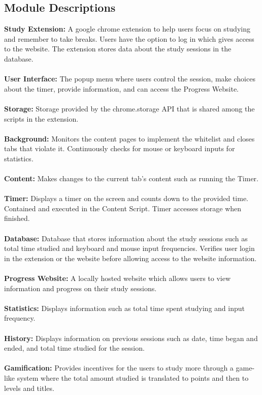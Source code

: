 \documentclass[12pt]{article}
\begin{document}
\subsection{Module Descriptions}
\textbf{Study Extension:} A google chrome extension to help users focus on studying and remember to take breaks. Users have the option to log in which gives access to the website. The extension stores data about the study sessions in the database. \\\\
\textbf{User Interface:} The popup menu where users control the session, make choices about the timer, provide information, and can access the Progress Website.\\\\
\textbf{Storage:} Storage provided by the chrome.storage API that is shared among the scripts in the extension.\\\\
\textbf{Background:} Monitors the content pages to implement the whitelist and closes tabs that violate it. Continuously checks for mouse or keyboard inputs for statistics.\\\\
\textbf{Content:} Makes changes to the current tab's content such as running the Timer.\\\\
\textbf{Timer:} Displays a timer on the screen and counts down to the provided time. Contained and executed in the Content Script. Timer accesses storage when finished.\\\\
\textbf{Database:} Database that stores information about the study sessions such as total time studied and keyboard and mouse input frequencies. Verifies user login in the extension or the website before allowing access to the website information. \\\\
\textbf{Progress Website:} A locally hosted website which allows users to view information and progress on their study sessions. \\\\
\textbf{Statistics:} Displays information such as total time spent studying and input frequency.\\\\
\textbf{History:} Displays information on previous sessions such as date, time began and ended, and total time studied for the session. \\\\
\textbf{Gamification:} Provides incentives for the users to study more through a game-like system where the total amount studied is translated to points and then to levels and titles.\\\\
\end{document}
